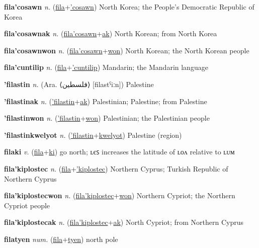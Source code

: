 \textbf{\hypertarget{fila'cosawn}{fila'cosawn}} \textit{n.} (\hyperlink{fila}{fila}+\allowbreak \hyperlink{'cosawn}{'cosawn})
North Korea; the People’s Democratic Republic of Korea

\textbf{\hypertarget{fila'cosawnak}{fila'cosawnak}} \textit{n.} (\hyperlink{fila'cosawn}{fila'cosawn}+\allowbreak \hyperlink{ak}{ak})
North Korean; from North Korea

\textbf{\hypertarget{fila'cosawnwon}{fila'cosawnwon}} \textit{n.} (\hyperlink{fila'cosawn}{fila'cosawn}+\allowbreak \hyperlink{won}{won})
North Korean; the North Korean people

\textbf{\hypertarget{fila'cuntilip}{fila'cuntilip}} \textit{n.} (\hyperlink{fila}{fila}+\allowbreak \hyperlink{'cuntilip}{'cuntilip})
Mandarin; the Mandarin language

\textbf{\hypertarget{'filastin}{'filastin}} \textit{n.} (Ara. ⟨{\arabics{}فلسطين}⟩ [filastˁiːn])
Palestine

\textbf{\hypertarget{'filastinak}{'filastinak}} \textit{n.} (\hyperlink{'filastin}{'filastin}+\allowbreak \hyperlink{ak}{ak})
Palestinian; Palestine; from Palestine

\textbf{\hypertarget{'filastinwon}{'filastinwon}} \textit{n.} (\hyperlink{'filastin}{'filastin}+\allowbreak \hyperlink{won}{won})
Palestinian; the Palestinian people

\textbf{\hypertarget{'filastinkwelyot}{'filastinkwelyot}} \textit{n.} (\hyperlink{'filastin}{'filastin}+\allowbreak \hyperlink{kwelyot}{kwelyot})
Palestine (region)

\textbf{\hypertarget{filaki}{filaki}} \textit{v.} (\hyperlink{fila}{fila}+\allowbreak \hyperlink{ki}{ki})
go north; ʟєꜱ increases the latitude of ʟᴏᴧ relative to ʟᴜᴍ

\textbf{\hypertarget{fila'kiplostec}{fila'kiplostec}} \textit{n.} (\hyperlink{fila}{fila}+\allowbreak \hyperlink{'kiplostec}{'kiplostec})
Northern Cyprus; Turkish Republic of Northern Cyprus

\textbf{\hypertarget{fila'kiplostecwon}{fila'kiplostecwon}} \textit{n.} (\hyperlink{fila'kiplostec}{fila'kiplostec}+\allowbreak \hyperlink{won}{won})
Northern Cypriot; the Northern Cypriot people

\textbf{\hypertarget{fila'kiplostecak}{fila'kiplostecak}} \textit{n.} (\hyperlink{fila'kiplostec}{fila'kiplostec}+\allowbreak \hyperlink{ak}{ak})
North Cypriot; from Northern Cyprus

\textbf{\hypertarget{filatyen}{filatyen}} \textit{num.} (\hyperlink{fila}{fila}+\allowbreak \hyperlink{tyen}{tyen})
north pole

